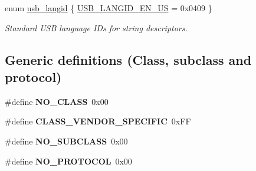 \begin{DoxyCompactItemize}
enum \hyperlink{group__usb__protocol__group_ga1f92deaf695c06566999f0c5343978c1}{usb\-\_\-langid} \{ \hyperlink{group__usb__protocol__group_gga1f92deaf695c06566999f0c5343978c1a8acad914e2d28c9bb1d2d3cc74c5b39e}{U\-S\-B\-\_\-\-L\-A\-N\-G\-I\-D\-\_\-\-E\-N\-\_\-\-U\-S} =  0x0409
 \}
\begin{DoxyCompactList}\small\item\em Standard U\-S\-B language I\-Ds for string descriptors. \end{DoxyCompactList}\end{DoxyCompactItemize}
\subsection*{Generic definitions (Class, subclass and protocol)}
\begin{DoxyCompactItemize}
\item 
\hypertarget{group__usb__protocol__group_ga6ce548e51895ce0226ee145753a9c815}{\#define {\bfseries N\-O\-\_\-\-C\-L\-A\-S\-S}~0x00}\label{group__usb__protocol__group_ga6ce548e51895ce0226ee145753a9c815}

\item 
\hypertarget{group__usb__protocol__group_gafed49ba6a490bd360070bca5d6cf4dc4}{\#define {\bfseries C\-L\-A\-S\-S\-\_\-\-V\-E\-N\-D\-O\-R\-\_\-\-S\-P\-E\-C\-I\-F\-I\-C}~0x\-F\-F}\label{group__usb__protocol__group_gafed49ba6a490bd360070bca5d6cf4dc4}

\item 
\hypertarget{group__usb__protocol__group_gaac34c41004ffdf924a770974fd4152d7}{\#define {\bfseries N\-O\-\_\-\-S\-U\-B\-C\-L\-A\-S\-S}~0x00}\label{group__usb__protocol__group_gaac34c41004ffdf924a770974fd4152d7}

\item 
\hypertarget{group__usb__protocol__group_gaa5e6e8476d28aa6869786f87751144d0}{\#define {\bfseries N\-O\-\_\-\-P\-R\-O\-T\-O\-C\-O\-L}~0x00}\label{group__usb__protocol__group_gaa5e6e8476d28aa6869786f87751144d0}

\end{DoxyCompactItemize}
